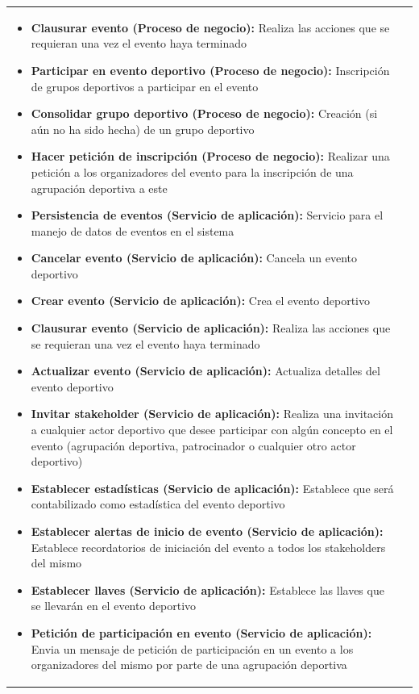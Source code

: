 \begin{table}[!htb]
\begin{center}
{\begin{tabular}{|p{7cm}|p{4cm}|}
\begin{itemize}
				\item \textbf{Clausurar evento (Proceso de negocio):} Realiza las acciones que se requieran una vez el evento haya terminado
				\item \textbf{Participar en evento deportivo (Proceso de negocio):} Inscripción de grupos deportivos a participar en el evento
				\item \textbf{Consolidar grupo deportivo (Proceso de negocio):} Creación (si aún no ha sido hecha) de un grupo deportivo
				\item \textbf{Hacer petición de inscripción (Proceso de negocio):} Realizar una petición a los organizadores del evento para la inscripción de una agrupación deportiva a este
				\item \textbf{Persistencia de eventos (Servicio de aplicación):} Servicio para el manejo de datos de eventos en el sistema
				\item \textbf{Cancelar evento (Servicio de aplicación):} Cancela un evento deportivo
				\item \textbf{Crear evento (Servicio de aplicación):} Crea el evento deportivo
				\item \textbf{Clausurar evento (Servicio de aplicación):} Realiza las acciones que se requieran una vez el evento haya terminado
				\item \textbf{Actualizar evento (Servicio de aplicación):} Actualiza detalles del evento deportivo
				\item \textbf{Invitar stakeholder (Servicio de aplicación):} Realiza una invitación a cualquier actor deportivo que desee participar con algún concepto en el evento (agrupación deportiva, patrocinador o cualquier otro actor deportivo)
				\item \textbf{Establecer estadísticas (Servicio de aplicación):} Establece que será contabilizado como estadística del evento deportivo
				\item \textbf{Establecer alertas de inicio de evento (Servicio de aplicación):} Establece recordatorios de iniciación del evento a todos los stakeholders del mismo
				\item \textbf{Establecer llaves (Servicio de aplicación):} Establece las llaves que se llevarán en el evento deportivo
				\item \textbf{Petición de participación en evento (Servicio de aplicación):} Envia un mensaje de petición de participación en un evento a los organizadores del mismo por parte de una agrupación deportiva
			\end{itemize} 
			&

\end{tabular}}
\end{center}
\end{table}
